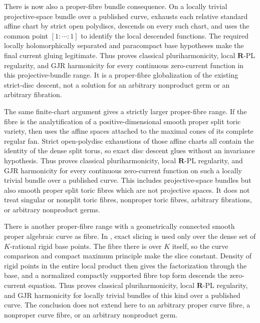 There is now also a proper-fibre bundle consequence.  On a locally trivial
projective-space bundle over a published curve,
 exhausts each relative standard
affine chart by strict open polydiscs, descends on every such chart, and uses
the common point \([1:\cdots:1]\) to identify the local descended functions.
The required locally holomorphically separated and paracompact base
hypotheses make the final current gluing legitimate.  Thus
 proves classical
pluriharmonicity, local \(\mathbf R\)-PL regularity, and GJR harmonicity for
every continuous zero-current function in this projective-bundle range.  It
is a proper-fibre globalization of the existing strict-disc descent, not a
solution for an arbitrary nonproduct germ or an arbitrary fibration.

The same finite-chart argument gives a strictly larger proper-fibre range.
If the fibre is the analytification of a positive-dimensional smooth proper
split toric variety, then
 uses the affine
spaces attached to the maximal cones of its complete regular fan.  Strict
open-polydisc exhaustions of those affine charts all contain the identity of
the dense split torus, so exact disc descent glues without an invariance
hypothesis.  Thus
 proves
classical pluriharmonicity, local \(\mathbf R\)-PL regularity, and GJR
harmonicity for every continuous zero-current function on such a locally
trivial bundle over a published curve.  This includes projective-space
bundles but also smooth proper split toric fibres which are not projective
spaces.  It does not treat singular or nonsplit toric fibres, nonproper
toric fibres, arbitrary fibrations, or arbitrary nonproduct germs.

There is another proper-fibre range with a geometrically connected smooth
proper algebraic curve as fibre.  In
, exact slicing is used
only over the dense set of \(K\)-rational rigid base points.  The fibre
there is over \(K\) itself, so the curve comparison and compact maximum
principle make the slice constant.  Density of rigid points in the entire
local product then gives the factorization through the base, and a normalized
compactly supported fibre top form descends the zero-current equation.  Thus
 proves classical
pluriharmonicity, local \(\mathbf R\)-PL regularity, and GJR harmonicity for
locally trivial bundles of this kind over a published curve.  The conclusion
does not extend here to an arbitrary proper curve fibre, a nonproper curve
fibre, or an arbitrary nonproduct germ.

